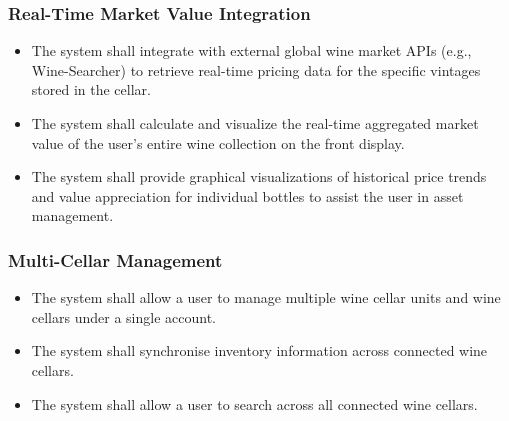 \documentclass[conference]{IEEEtran}
\begin{document}
\subsubsection{Real-Time Market Value Integration}
\begin{itemize}
    \item The system shall integrate with external global wine market APIs (e.g., Wine-Searcher) to retrieve real-time pricing data for the specific vintages stored in the cellar.
    \item The system shall calculate and visualize the real-time aggregated market value of the user's entire wine collection on the front display.
    \item The system shall provide graphical visualizations of historical price trends and value appreciation for individual bottles to assist the user in asset management.
\end{itemize}

\subsubsection{Multi-Cellar Management}
\begin{itemize}
    \item The system shall allow a user to manage multiple wine cellar units and wine cellars under a single account.
    \item The system shall synchronise inventory information across connected wine cellars.
    \item The system shall allow a user to search across all connected wine cellars.
\end{itemize}
\end{document}
